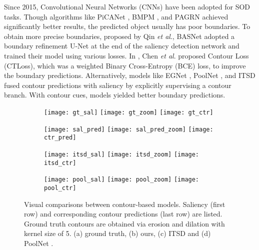 \documentclass[10pt,twocolumn,letterpaper]{article}
\begin{document}
Since 2015, Convolutional Neural Networks (CNNs) \cite{ResNet}\cite{ImageNet} have been adopted for SOD tasks. Though algorithms like PiCANet \cite{PICANET}, BMPM \cite{BMPM}, and PAGRN \cite{PAGRN} achieved significantly better results, the predicted object usually has poor boundaries. To obtain more precise boundaries, proposed by Qin \textit{et al}., BASNet \cite{BASNET} adopted a boundary refinement U-Net \cite{UNET} at the end of the saliency detection network and trained their model using various losses. In \cite{CTLoss}, Chen \textit{et al}. proposed Contour Loss (CTLoss), which was a weighted Binary Cross-Entropy (BCE) loss, to improve the boundary predictions. Alternatively, models like EGNet \cite{EGNET}, PoolNet \cite{POOLNET}, and ITSD \cite{ITSD} fused contour predictions with saliency by explicitly supervising a contour branch. With contour cues, models yielded better boundary predictions.

\begin{figure}[!t]
\centering
\begin{subfigure}{.24\linewidth}
\centering
\texttt{[image: gt\_sal]}
\texttt{[image: gt\_zoom]}
\texttt{[image: gt\_ctr]}
\caption{}
\label{fig:gt_sal}
\end{subfigure}
\begin{subfigure}{.24\linewidth}
\centering
\texttt{[image: sal\_pred]}
\texttt{[image: sal\_pred\_zoom]}
\texttt{[image: ctr\_pred]}
\caption{}
\label{fig:sal_pred}
\end{subfigure}
\begin{subfigure}{.24\linewidth}
\centering
\texttt{[image: itsd\_sal]}
\texttt{[image: itsd\_zoom]}
\texttt{[image: itsd\_ctr]}
\caption{}
\label{fig:itsd_sal}
\end{subfigure}
\begin{subfigure}{.24\linewidth}
\centering
\texttt{[image: pool\_sal]}
\texttt{[image: pool\_zoom]}
\texttt{[image: pool\_ctr]}
\caption{}
\label{fig:pool_sal}
\end{subfigure}
\caption{Visual comparisons between contour-based models. Saliency (first row) and corresponding contour predictions (last row) are listed. Ground truth contours are obtained via erosion and dilation with kernel size of 5. (a) ground truth, (b) ours, (c) ITSD \cite{ITSD} and (d) PoolNet \cite{POOLNET}. }
  \label{fig:excessiveFP}
\end{figure}
\end{document}
